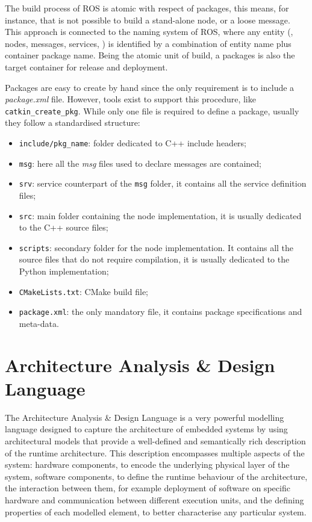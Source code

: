 The build process of ROS is atomic with respect of packages, this means, for instance, that is not possible to build a stand-alone node, or a loose message. This approach is connected to the naming system of ROS, where any entity (\eg, nodes, messages, services, \etc) is identified by a combination of entity name plus container package name. Being the atomic unit of build, a packages is also the target container for release and deployment.

Packages are easy to create by hand since the only requirement is to include a \textit{package.xml} file. However, tools exist to support this procedure, like \texttt{catkin\_create\_pkg}. While only one file is required to define a package, usually they follow a standardised structure:
\begin{itemize}
\item \texttt{include/pkg\_name}: folder dedicated to C++ include headers;
\item \texttt{msg}: here all the \textit{msg} files used to declare messages are contained;
\item \texttt{srv}: service counterpart of the \texttt{msg} folder, it contains all the service definition files;
\item \texttt{src}: main folder containing the node implementation, it is usually dedicated to the C++ source files;
\item \texttt{scripts}: secondary folder for the node implementation. It contains all the source files that do not require compilation, it is usually dedicated to the Python implementation; 
\item \texttt{CMakeLists.txt}: CMake build file;
\item \texttt{package.xml}: the only mandatory file, it contains package specifications and meta-data.
\end{itemize} 

\section{Architecture Analysis \& Design Language}
\label{sec:AADL}

The Architecture Analysis \& Design Language is a very powerful modelling language designed to capture the architecture of embedded systems by using architectural models that provide a well-defined and semantically rich description of the runtime architecture. This description encompasses multiple aspects of the system: hardware components, to encode the underlying physical layer of the system, software components, to define the runtime behaviour of the architecture, the interaction between them, for example deployment of software on specific hardware and communication between different execution units, and the defining properties of each modelled element, to better characterise any particular system.

